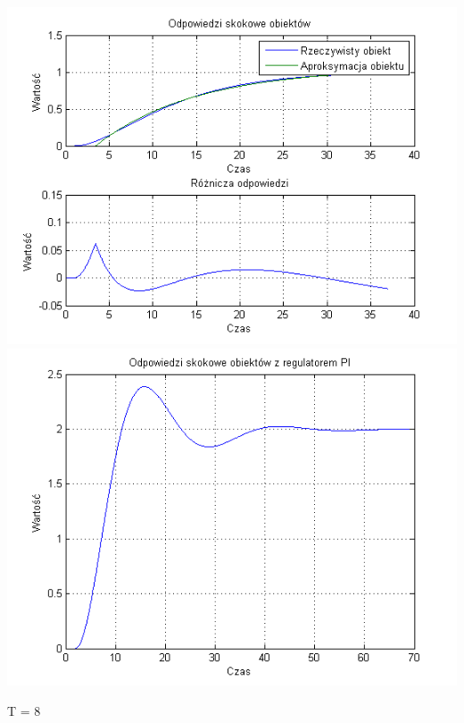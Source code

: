 \documentclass[10pt,a4paper]{article}
\begin{document}
\begin{center}
\includegraphics[scale=1]{images/jeden/skrypt_69.png}\\
\includegraphics[scale=1]{images/jeden/skrypt_70.png}\\
\end{center}
\newpage
T = 8
\end{document}
